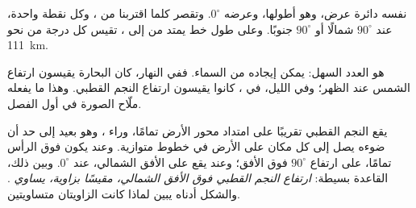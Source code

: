  نفسه دائرة عرض، وهو أطولها، وعرضه $0^\circ$.
وتقصر  كلما اقتربنا من ، وكل  نقطة
واحدة، عند $90^\circ$ شمالًا أو $90^\circ$ جنوبًا. وعلى طول خط يمتد من  إلى
، تقيس كل درجة من  نحو \qty{111}{km}.

 هو العدد السهل: يمكن إيجاده من السماء. ففي النهار،
كان البحارة يقيسون ارتفاع الشمس عند الظهر؛ وفي الليل، في ، كانوا يقيسون ارتفاع النجم القطبي. وهذا ما يفعله
ملّاح الصورة في أول الفصل.

يقع النجم القطبي تقريبًا على امتداد محور الأرض تمامًا،
وراء ، وهو بعيد إلى حد أن ضوءه يصل إلى
كل مكان على الأرض في خطوط متوازية. وعند  يكون
فوق الرأس تمامًا، على ارتفاع $90^\circ$ فوق الأفق؛ وعند  يقع
على الأفق الشمالي، عند $0^\circ$. وبين ذلك، القاعدة بسيطة:
\emph{ارتفاع النجم القطبي فوق الأفق الشمالي، مقيسًا
بزاوية، يساوي }. والشكل أدناه يبين لماذا كانت
الزاويتان متساويتين.

